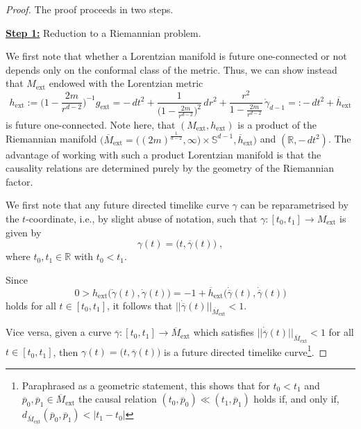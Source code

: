 \documentclass[reqno]{article}
\newcommand{\R}{\mathbb{R}}
\newcommand{\Mext}{M_{\mathrm{ext}}}
\newcommand{\gext}{g_{\mathrm{ext}}}
\newcommand{\hext}{h_\mathrm{ext}}
\newcommand{\oMe}{\overline{M}_\mathrm{ext}}
\begin{document}
\begin{proof}
The proof proceeds in two steps.
\vspace*{2mm}

\underline{\textbf{Step 1:}} Reduction to a Riemannian problem.
\vspace*{2mm}

We first note that whether a Lorentzian manifold is future one-connected or not depends only on the conformal class of the metric.
Thus, we can show instead that $\Mext$ endowed with the Lorentzian metric
\begin{equation*}
h_\mathrm{ext} := \big(1 - \frac{2m}{r^{d-2}}\big)^{-1} \gext = -\,dt^2 + \frac{1}{\big(1 - \frac{2m}{r^{d-2}}\big)^2} \,dr^2 + \frac{r^2}{1 - \frac{2m}{r^{d-2}}} \, \mathring{\gamma}_{d-1} =: -\,dt^2 + \overline{h}_{\mathrm{ext}}
\end{equation*}
is future one-connected. 
Note here, that $(\Mext, \hext)$ is a product of the Riemannian manifold $\big(\overline{M}_{\mathrm{ext}} = \big((2m)^{\frac{1}{d-2}}, \infty\big) \times \mathbb{S}^{d-1}, \overline{h}_{\mathrm{ext}}\big)$ and $(\R, -\,dt^2)$.  The advantage of working with such a product Lorentzian manifold is that the causality relations are determined purely by the geometry of the Riemannian factor. 

We first note that any future directed timelike curve $\gamma$ can be reparametrised by the $t$-coordinate, i.e., by slight abuse of notation, such that $\gamma : [t_0, t_1] \to \Mext$ is given by
\begin{equation*}
\gamma(t) = \big(t, \overline{\gamma}(t)\big)\;,
\end{equation*}
where $t_0, t_1 \in \R$ with $t_0 < t_1$. 

Since 
\begin{equation*}
0 > \hext\big(\dot{\gamma}(t), \dot{\gamma}(t)\big) = -1 + \overline{h}_{\mathrm{ext}}\big(\dot{\overline{\gamma}}(t), \dot{\overline{\gamma}}(t)\big)
\end{equation*}
holds for all $t \in [t_0, t_1]$, it follows that $||\dot{\overline{\gamma}}(t)||_{\overline{M}_{\mathrm{ext}}} <1$.

Vice versa, given a curve $\overline{\gamma} : [t_0, t_1] \to \overline{M}_{\mathrm{ext}}$ which satisfies $||\dot{\overline{\gamma}}(t)||_{\overline{M}_{\mathrm{ext}}} <1$  for all $t \in [t_0, t_1]$, then $\gamma(t) = \big(t, \overline{\gamma}(t)\big)$ is a future directed timelike curve\footnote{Paraphrased as a geometric statement, this shows that for $t_0 < t_1$ and $\overline{p}_0, \overline{p}_1 \in \oMe$ the causal relation $(t_0, \overline{p}_0) \ll (t_1, \overline{p}_1)$ holds if, and only if,  $d_{\oMe}(\overline{p}_0, \overline{p}_1) < |t_1 - t_0|$}.


\end{proof}
\end{document}
